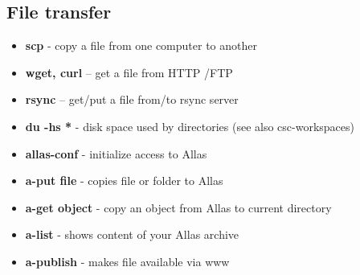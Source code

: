 \documentclass{article}
\begin{document}
\begin{Parallel}{0.48\textwidth}{0.48\textwidth}
{\section*{File transfer}
\begin{itemize}
    \item \textbf{scp} - copy a file from one computer to another
    \item \textbf{wget, curl} – get a file from HTTP /FTP
    \item \textbf{rsync} – get/put a file from/to rsync server
    \item \textbf{du -hs *} - disk space used by directories (see also csc-workspaces)
    \item \textbf{allas-conf} - initialize access to Allas 
    \item \textbf{a-put file} - copies file or folder to Allas 	
    \item \textbf{a-get object} - copy an object from Allas to current directory 
    \item \textbf{a-list} - shows content of your Allas archive
    \item \textbf{a-publish} - makes file available via www
    \\
    \\
\end{itemize}
}
\end{Parallel}
\end{document}
